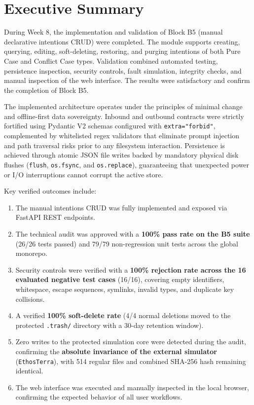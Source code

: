 \documentclass[11pt,a4paper]{article}
\begin{document}
\newpage
\tableofcontents
\newpage

\section{Executive Summary}

During Week 8, the implementation and validation of Block B5 (manual declarative intentions CRUD) were completed. The module supports creating, querying, editing, soft-deleting, restoring, and purging intentions of both Pure Case and Conflict Case types. Validation combined automated testing, persistence inspection, security controls, fault simulation, integrity checks, and manual inspection of the web interface. The results were satisfactory and confirm the completion of Block B5.

The implemented architecture operates under the principles of minimal change and offline-first data sovereignty. Inbound and outbound contracts were strictly fortified using Pydantic V2 schemas configured with \texttt{extra="forbid"}, complemented by whitelisted regex validators that eliminate prompt injection and path traversal risks prior to any filesystem interaction. Persistence is achieved through atomic JSON file writes backed by mandatory physical disk flushes (\texttt{flush}, \texttt{os.fsync}, and \texttt{os.replace}), guaranteeing that unexpected power or I/O interruptions cannot corrupt the active store.

Key verified outcomes include:
\begin{enumerate}[itemsep=2pt]
    \item The manual intentions CRUD was fully implemented and exposed via FastAPI REST endpoints.
    \item The technical audit was approved with a \textbf{100\% pass rate on the B5 suite} (26/26 tests passed) and 79/79 non-regression unit tests across the global monorepo.
    \item Security controls were verified with a \textbf{100\% rejection rate across the 16 evaluated negative test cases} (16/16), covering empty identifiers, whitespace, escape sequences, symlinks, invalid types, and duplicate key collisions.
    \item A verified \textbf{100\% soft-delete rate} (4/4 normal deletions moved to the protected \texttt{.trash/} directory with a 30-day retention window).
    \item Zero writes to the protected simulation core were detected during the audit, confirming the \textbf{absolute invariance of the external simulator} (\texttt{EthosTerra}), with 514 regular files and combined SHA-256 hash remaining identical.
    \item The web interface was executed and manually inspected in the local browser, confirming the expected behavior of all user workflows.
\end{enumerate}
\end{document}
